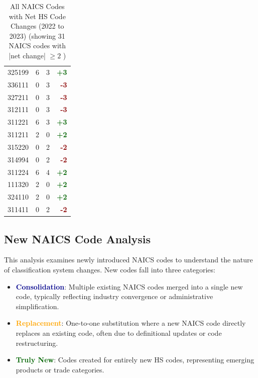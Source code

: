 \documentclass[11pt]{article}
\begin{document}
\begin{table}[H]
\begin{minipage}{0.48\textwidth}
\begin{tabular}{lrrr}
325199 & 6 & 3 & \textcolor{darkgreen}{\textbf{+3}} \\
336111 & 0 & 3 & \textcolor{darkred}{\textbf{-3}} \\
327211 & 0 & 3 & \textcolor{darkred}{\textbf{-3}} \\
312111 & 0 & 3 & \textcolor{darkred}{\textbf{-3}} \\
311221 & 6 & 3 & \textcolor{darkgreen}{\textbf{+3}} \\
311211 & 2 & 0 & \textcolor{darkgreen}{\textbf{+2}} \\
315220 & 0 & 2 & \textcolor{darkred}{\textbf{-2}} \\
314994 & 0 & 2 & \textcolor{darkred}{\textbf{-2}} \\
311224 & 6 & 4 & \textcolor{darkgreen}{\textbf{+2}} \\
111320 & 2 & 0 & \textcolor{darkgreen}{\textbf{+2}} \\
324110 & 2 & 0 & \textcolor{darkgreen}{\textbf{+2}} \\
311411 & 0 & 2 & \textcolor{darkred}{\textbf{-2}} \\
\bottomrule
\end{tabular}
\end{minipage}
\caption{All NAICS Codes with Net HS Code Changes (2022 to 2023) (showing 31 NAICS codes with |net change| $\geq 2$ )}
\end{table}


\subsection{New NAICS Code Analysis}

This analysis examines newly introduced NAICS codes to understand the nature of classification system changes. New codes fall into three categories:

\begin{itemize}
    \item \textcolor{darkblue}{\textbf{Consolidation}}: Multiple existing NAICS codes merged into a single new code, typically reflecting industry convergence or administrative simplification.
    \item \textcolor{orange}{\textbf{Replacement}}: One-to-one substitution where a new NAICS code directly replaces an existing code, often due to definitional updates or code restructuring.
    \item \textcolor{darkgreen}{\textbf{Truly New}}: Codes created for entirely new HS codes, representing emerging products or trade categories.
\end{itemize}
\end{document}
